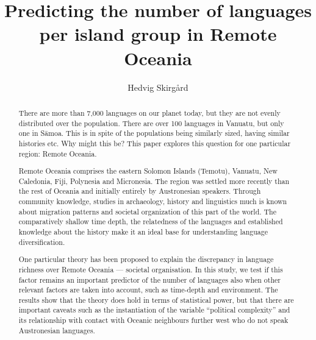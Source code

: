 \documentclass[12pt,letterpaper]{article}
\title{Predicting the number of languages per island group in Remote Oceania}
\author{Hedvig Skirg{\aa}rd}
\affil{Department of Linguistic and Cultural Evolution,\linebreak Max Planck Institute for Evolutionary Anthropology.\linebreak Deutscher Platz 6, 04103 Leipzig. \linebreak Hedvig{\_}skirgard$@$eva.mpg.de
}
\begin{document}
\def\code#1{\texttt{#1}}

\thispagestyle{empty}

\maketitle
\thispagestyle{empty}



\begin{abstract}
\doublespacing
\normalsize
There are more than 7,000 languages on our planet today, but they are not evenly distributed over the population. There are over 100 languages in Vanuatu, but only one in S\={a}moa. This is in spite of the populations being similarly sized, having similar histories etc. Why might this be? This paper explores this question for one particular region: Remote Oceania.

Remote Oceania comprises the eastern Solomon Islands (Temotu), Vanuatu, New Caledonia, Fiji, Polynesia and Micronesia. The region was settled more recently than the rest of Oceania and initially entirely by Austronesian speakers. Through community knowledge, studies in archaeology, history and linguistics much is known about migration patterns and societal organization of this part of the world. The comparatively shallow time depth, the relatedness of the languages and established knowledge about the history make it an ideal base for understanding language diversification. 

One particular theory has been proposed to explain the discrepancy in language richness over Remote Oceania --- societal organisation. In this study, we test if this factor remains an important predictor of the number of languages also when other relevant factors are taken into account, such as time-depth and environment. The results show that the theory does hold in terms of statistical power, but that there are important caveats such as the instantiation of the variable ``political complexity'' and its relationship with contact with Oceanic neighbours further west who do not speak Austronesian languages.



\end{abstract}

\newpage
\end{document}
